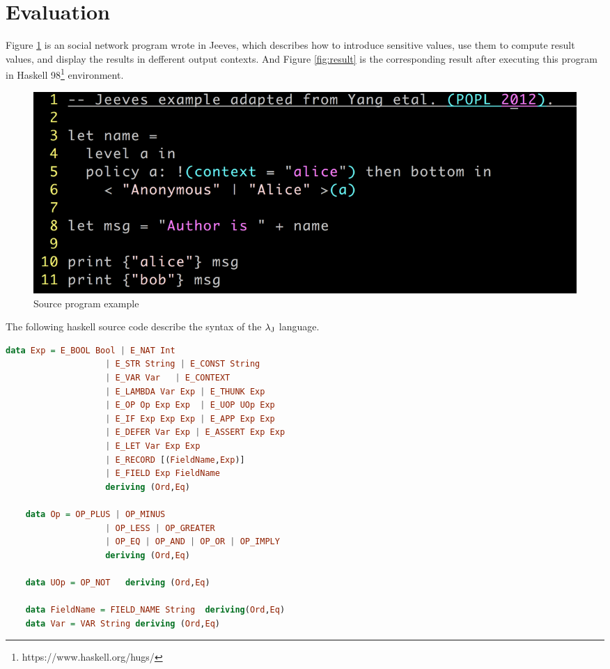 \section{Evaluation}
\label{evaluation}
Figure \ref{fig:program} is an social network program wrote in Jeeves, which describes how to introduce sensitive values, use them to compute result values, and display the results in defferent output contexts. And Figure \ref{fig:result} is the corresponding result after executing this program in Haskell 98\footnote{https://www.haskell.org/hugs/} environment.
\begin{figure}[h]
    \centering
    \includegraphics[width=1.0\textwidth]{program.PNG}
    \caption{Source program example}
    \label{fig:program}
\end{figure}

The following haskell source code describe the syntax of the ${\lambda_{\text{J}}}$ language.
\begin{lstlisting}[language=Haskell]
    data Exp = E_BOOL Bool | E_NAT Int 
                    | E_STR String | E_CONST String  
                    | E_VAR Var   | E_CONTEXT 
                    | E_LAMBDA Var Exp | E_THUNK Exp 
                    | E_OP Op Exp Exp  | E_UOP UOp Exp                    
                    | E_IF Exp Exp Exp | E_APP Exp Exp                   
                    | E_DEFER Var Exp | E_ASSERT Exp Exp                  
                    | E_LET Var Exp Exp                   
                    | E_RECORD [(FieldName,Exp)] 
                    | E_FIELD Exp FieldName
                    deriving (Ord,Eq)
    
    data Op = OP_PLUS | OP_MINUS
                    | OP_LESS | OP_GREATER 
                    | OP_EQ | OP_AND | OP_OR | OP_IMPLY
                    deriving (Ord,Eq)
    
    data UOp = OP_NOT   deriving (Ord,Eq) 
    
    data FieldName = FIELD_NAME String  deriving(Ord,Eq)
    data Var = VAR String deriving (Ord,Eq)
\end{lstlisting}

